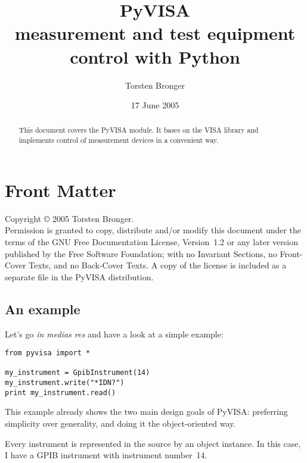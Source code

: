 \documentclass{howto}
\title{PyVISA\\[0.5ex]\large measurement and test equipment control with Python}
\author{Torsten Bronger}
\date{17 June 2005}
\begin{document}
\maketitle

\ifhtml
\chapter*{Front Matter\label{front}}
\fi

Copyright \copyright{} 2005 Torsten Bronger.\\
Permission is granted to copy, distribute and/or modify this document under the
terms of the GNU Free Documentation License, Version~1.2 or any later version
published by the Free Software Foundation; with no Invariant Sections, no
Front-Cover Texts, and no Back-Cover Texts.  A copy of the license is included
as a separate file  in the PyVISA distribution.

\begin{abstract}

\noindent
This document covers the PyVISA module.  It bases on the VISA library and
implements control of measurement devices in a convenient way.
\end{abstract}

\tableofcontents


\section{An example}

Let's go \emph{in medias res} and have a look at a simple example:
\begin{verbatim}
from pyvisa import *

my_instrument = GpibInstrument(14)
my_instrument.write("*IDN?")
print my_instrument.read()
\end{verbatim}
This example already shows the two main design goals of PyVISA: preferring
simplicity over generality, and doing it the object-oriented way.

Every instrument is represented in the source by an object instance.  In this case,
I have a GPIB instrument with instrument number~14.
\end{document}
